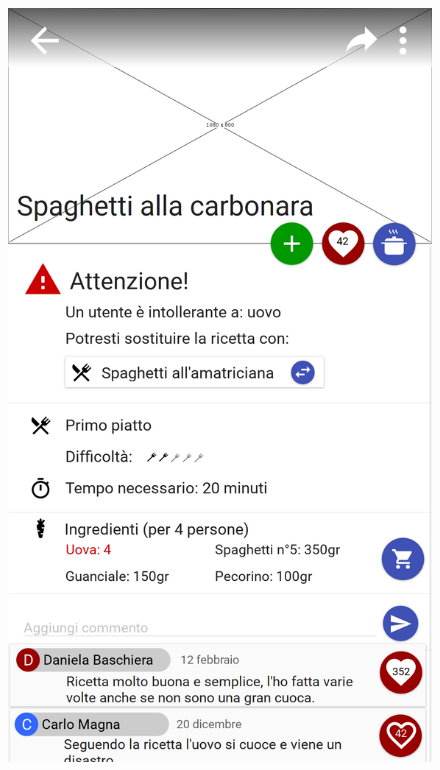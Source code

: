 \begin{figure}[H]
	\begin{minipage}{.49\textwidth}
		\includegraphics[width=\textwidth]{img/wireframe/presentazione_ricetta_allergia_cambio_ricetta_aggiungi_ricetta.png}
	\end{minipage}
	\begin{minipage}{.49\textwidth}

\end{minipage}
\end{figure}
